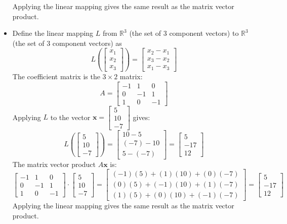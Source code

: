 \documentclass{article}
\begin{document}
\begin{itemize}
Applying the linear mapping gives the same result as the matrix vector product. 
\item Define the linear mapping \(L\) from \(\mathbb{R}^3\) (the set of \(3\) component vectors) to \(\mathbb{R}^3\) (the set of \(3\) component vectors) as 
\[L\left(\begin{bmatrix} x_1 \\ x_2 \\ x_3 \end{bmatrix}\right) = \begin{bmatrix} x_2 - x_1 \\ x_3 - x_2 \\ x_1 - x_3 \end{bmatrix}\]
The coefficient matrix is the \(3 \times 2\) matrix:
\[A = \begin{bmatrix} -1 & 1 & 0 \\ 0 & -1 & 1 \\ 1 & 0 & -1 \end{bmatrix}\]
Applying \(L\) to the vector \(\mathbf{x} = \begin{bmatrix} 5 \\ 10 \\ -7 \end{bmatrix}\) gives:
\[L\left(\begin{bmatrix} 5 \\ 10 \\ -7 \end{bmatrix}\right) = \begin{bmatrix} 10 - 5 \\ (-7) - 10 \\ 5 - (-7) \end{bmatrix} = \begin{bmatrix} 5 \\ -17 \\ 12 \end{bmatrix}\]
The matrix vector product \(A\mathbf{x}\) is:
\[\begin{bmatrix} -1 & 1 & 0 \\ 0 & -1 & 1 \\ 1 & 0 & -1 \end{bmatrix} \cdot \begin{bmatrix} 5 \\ 10 \\ -7 \end{bmatrix} = \begin{bmatrix} (-1)(5) + (1)(10) + (0)(-7) \\ (0)(5) + (-1)(10) + (1)(-7) \\ (1)(5) + (0)(10) + (-1)(-7) \end{bmatrix} = \begin{bmatrix} 5 \\ -17 \\ 12 \end{bmatrix}\]
Applying the linear mapping gives the same result as the matrix vector product. 
\end{itemize}
\end{document}
